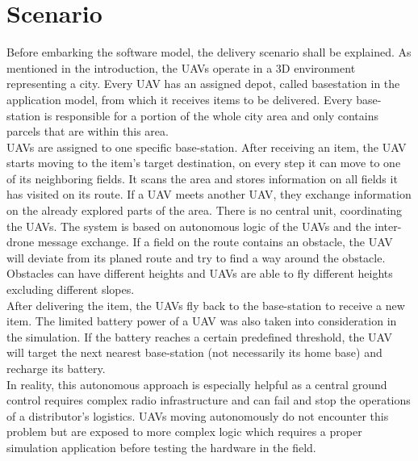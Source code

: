 \section{Scenario}\label{sec:scenario}
Before embarking the software model, the delivery scenario shall be explained. As mentioned in the introduction, the UAVs operate in a 3D environment representing a city. Every UAV has an assigned depot, called basestation in the application model, from which it receives items to be delivered. Every base-station is responsible for a portion of the whole city area and only contains parcels that are within this area. \\
 UAVs are assigned to one specific base-station. After receiving an item, the UAV starts moving to the item’s target destination, on every step it can move to one of its neighboring fields. It scans the area and stores information on all fields it has visited on its route. If a UAV meets another UAV, they exchange information on the already explored parts of the area. There is no central unit, coordinating the UAVs. The system is based on autonomous logic of the UAVs and the inter-drone message exchange. If a field on the route contains an obstacle, the UAV will deviate from its planed route and try to find a way around the obstacle. Obstacles can have different heights and UAVs are able to fly different heights excluding different slopes. \\
After delivering the item, the UAVs fly back to the base-station to receive a new item. The limited battery power of a UAV was also taken into consideration in the simulation. If the battery reaches a certain predefined threshold, the UAV will target the next nearest base-station (not necessarily its home base) and recharge its battery.\\
In reality, this autonomous approach is especially helpful as a central ground control requires complex radio infrastructure and can fail and stop the operations of a distributor's logistics.  UAVs moving autonomously do not encounter this problem but are exposed to more complex logic which requires a proper simulation application before testing the hardware in the field.

